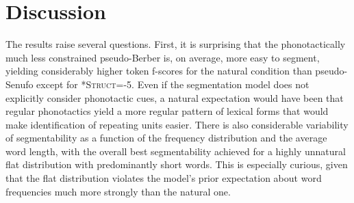 \documentclass[11pt]{article}
\begin{document}
\section{Discussion}
\vspace*{-5pt}
The results raise several questions. First, it is surprising that the phonotactically much less constrained pseudo-Berber is, on average, more easy to segment, yielding considerably higher token f-scores for the natural  condition than pseudo-Senufo except for \textsc{*Struct}=-5. Even if the segmentation model does not explicitly consider phonotactic cues, a natural expectation would have been that regular phonotactics yield a more regular pattern of lexical forms that would make identification of repeating units easier. There is also considerable variability of segmentability as a function of the frequency distribution and the average word length, with the overall best segmentability achieved for a highly unnatural flat distribution with predominantly short words. This is especially curious, given that the flat distribution violates the model's prior expectation about word frequencies much more strongly than the natural one.
\end{document}
